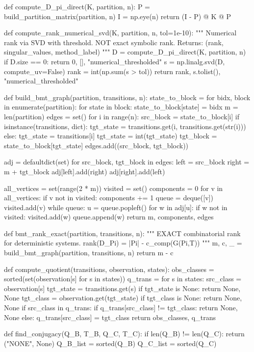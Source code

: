 def compute_D_pi_direct(K, partition, n):
P = build_partition_matrix(partition, n)
I = np.eye(n)
return (I - P) @ K @ P

def compute_rank_numerical_svd(K, partition, n, tol=1e-10):
"""
Numerical rank via SVD with threshold. NOT exact symbolic rank.
Returns: (rank, singular_values, method_label)
"""
D = compute_D_pi_direct(K, partition, n)
if D.size == 0:
return 0, [], "numerical_thresholded"
s = np.linalg.svd(D, compute_uv=False)
rank = int(np.sum(s > tol))
return rank, s.tolist(), "numerical_thresholded"

def build_bmt_graph(partition, transitions, n):
state_to_block = {}
for bidx, block in enumerate(partition):
for state in block:
state_to_block[state] = bidx
m = len(partition)
edges = set()
for i in range(n):
src_block = state_to_block[i]
if isinstance(transitions, dict):
tgt_state = transitions.get(i, transitions.get(str(i)))
else:
tgt_state = transitions[i]
tgt_state = int(tgt_state)
tgt_block = state_to_block[tgt_state]
edges.add((src_block, tgt_block))

adj = defaultdict(set)  
for src_block, tgt_block in edges:  
    left = src_block  
    right = m + tgt_block  
    adj[left].add(right)  
    adj[right].add(left)  
  
all_vertices = set(range(2 * m))  
visited = set()  
components = 0  
for v in all_vertices:  
    if v not in visited:  
        components += 1  
        queue = deque([v])  
        visited.add(v)  
        while queue:  
            u = queue.popleft()  
            for w in adj[u]:  
                if w not in visited:  
                    visited.add(w)  
                    queue.append(w)  
return m, components, edges

def bmt_rank_exact(partition, transitions, n):
"""
EXACT combinatorial rank for deterministic systems.
rank(D_Pi) = |Pi| - c_comp(G(Pi,T))
"""
m, c, _ = build_bmt_graph(partition, transitions, n)
return m - c

def compute_quotient(transitions, observation, states):
obs_classes = sorted(set(observation[s] for s in states))
q_trans = {}
for s in states:
src_class = observation[s]
tgt_state = transitions.get(s)
if tgt_state is None:
return None, None
tgt_class = observation.get(tgt_state)
if tgt_class is None:
return None, None
if src_class in q_trans:
if q_trans[src_class] != tgt_class:
return None, None
else:
q_trans[src_class] = tgt_class
return obs_classes, q_trans

def find_conjugacy(Q_B, T_B, Q_C, T_C):
if len(Q_B) != len(Q_C):
return ("NONE", None)
Q_B_list = sorted(Q_B)
Q_C_list = sorted(Q_C)

